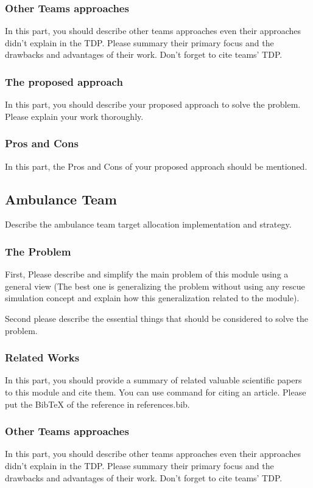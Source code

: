 \documentclass[runningheads,a4paper]{llncs}
\begin{document}
\subsubsection{Other Teams approaches}
In this part, you should describe other teams approaches even their approaches didn't explain in the TDP. Please summary their primary focus and the drawbacks and advantages of their work. Don't forget to cite teams' TDP.
\subsubsection{The proposed approach}
In this part, you should describe your proposed approach to solve the problem. Please explain your work thoroughly.
\subsubsection{Pros and Cons}
In this part, the Pros and Cons of your proposed approach should be mentioned.

\subsection{Ambulance Team}
Describe the ambulance team target allocation implementation and strategy.
\subsubsection{The Problem}
First, Please describe and simplify the main problem of this module using a general view (The best one is generalizing the problem without using any rescue simulation concept and explain how this generalization related to the module).

Second please describe the essential things that should be considered to solve the problem.
\subsubsection{Related Works}
In this part, you should provide a summary of related valuable scientific papers to this module and cite them. You can use command \cite{ref1} for citing an article. Please put the BibTeX of the reference in references.bib.
\subsubsection{Other Teams approaches}
In this part, you should describe other teams approaches even their approaches didn't explain in the TDP. Please summary their primary focus and the drawbacks and advantages of their work. Don't forget to cite teams' TDP.
\end{document}
